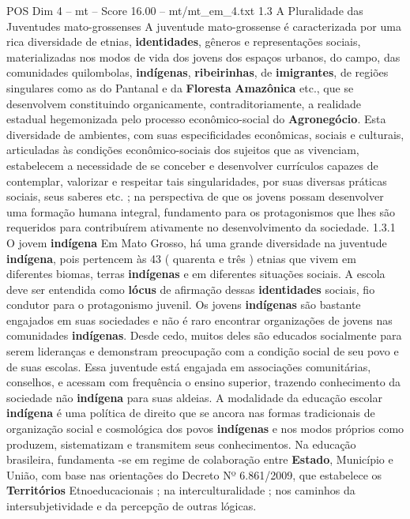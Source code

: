 \begin{textsample}{POS Dim 4 – mt – Score 16.00 – mt/mt\_em\_4.txt}  \label{ex:f4_pos_172}
1.3 A Pluralidade das Juventudes mato-grossenses A juventude mato-grossense é caracterizada por uma rica diversidade de etnias, \textbf{identidades}, gêneros e representações sociais, materializadas nos modos de vida dos jovens dos espaços urbanos, do campo, das comunidades quilombolas, \textbf{indígenas}, \textbf{ribeirinhas}, de \textbf{imigrantes}, de regiões singulares como as do Pantanal e da \textbf{Floresta} \textbf{Amazônica} etc., que se desenvolvem constituindo organicamente, contraditoriamente, a realidade estadual hegemonizada pelo processo econômico-social do \textbf{Agronegócio}.
Esta diversidade de ambientes, com suas especificidades econômicas, sociais e culturais, articuladas às condições econômico-sociais dos sujeitos que as vivenciam, estabelecem a necessidade de se conceber e desenvolver currículos capazes de contemplar, valorizar e respeitar tais singularidades, por suas diversas práticas sociais, seus saberes etc. ; na perspectiva de que os jovens possam desenvolver uma formação humana integral, fundamento para os protagonismos que lhes são requeridos para contribuírem ativamente no desenvolvimento da sociedade. 1.3.1 O jovem \textbf{indígena} Em Mato Grosso, há uma grande diversidade na juventude \textbf{indígena}, pois pertencem às 43 ( quarenta e três ) etnias que vivem em diferentes biomas, terras \textbf{indígenas} e em diferentes situações sociais.
A escola deve ser entendida como \textbf{lócus} de afirmação dessas \textbf{identidades} sociais, fio condutor para o protagonismo juvenil.
Os jovens \textbf{indígenas} são bastante engajados em suas sociedades e não é raro encontrar organizações de jovens nas comunidades \textbf{indígenas}.
Desde cedo, muitos deles são educados socialmente para serem lideranças e demonstram preocupação com a condição social de seu povo e de suas escolas.
Essa juventude está engajada em associações comunitárias, conselhos, e acessam com frequência o ensino superior, trazendo conhecimento da sociedade não \textbf{indígena} para suas aldeias.
A modalidade da educação escolar \textbf{indígena} é uma política de direito que se ancora nas formas tradicionais de organização social e cosmológica dos povos \textbf{indígenas} e nos modos próprios como produzem, sistematizam e transmitem seus conhecimentos.
Na educação brasileira, fundamenta -se em regime de colaboração entre \textbf{Estado}, Município e União, com base nas orientações do Decreto Nº 6.861/2009, que estabelece os \textbf{Territórios} Etnoeducacionais ; na interculturalidade ; nos caminhos da intersubjetividade e da percepção de outras lógicas.

\end{textsample}
